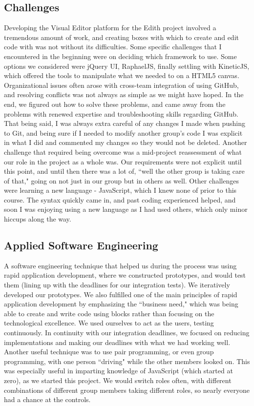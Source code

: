 \documentclass[a4paper]{article}
\begin{document}
\subsection{Challenges}
Developing the Visual Editor platform for the Edith project involved a tremendous amount of work, and creating boxes with which to create and edit code with was not without its difficulties. Some specific challenges that I encountered in the beginning were on deciding which framework to use. Some options we considered were jQuery UI, RaphaelJS, finally settling with KineticJS, which offered the tools to manipulate what we needed to on a HTML5 canvas. Organizational issues often arose with cross-team integration of using GitHub, and resolving conflicts was not always as simple as we might have hoped. In the end, we figured out how to solve these problems, and came away from the problems with renewed expertise and troubleshooting skills regarding GitHub. That being said, I was always extra careful of any changes I made when pushing to Git, and being sure if I needed to modify another group's code I was explicit in what I did and commented my changes so they would not be deleted. Another challenge that required being overcome was a mid-project reassessment of what our role in the project as a whole was. Our requirements were not explicit until this point, and until then there was a lot of, ``well the other group is taking care of that," going on not just in our group but in others as well. Other challenges were learning a new language - JavaScript, which I knew none of prior to this course. The syntax quickly came in, and past coding experienced helped, and soon I was enjoying using a new language as I had used others, which only minor hiccups along the way.
\subsection{Applied Software Engineering}
A software engineering technique that helped us during the process was using rapid application development, where we constructed prototypes, and would test them (lining up with the deadlines for our integration tests). We iteratively developed our prototypes. We also fulfilled one of the main principles of rapid application development by emphasizing the ``business need," which was being able to create and write code using blocks rather than focusing on the technological excellence. We used ourselves to act as the users, testing continuously. In continuity with our integration deadlines, we focused on reducing implementations and making our deadlines with what we had working well. Another useful technique was to use pair programming, or even group programming, with one person ``driving" while the other members looked on. This was especially useful in imparting knowledge of JavaScript (which started at zero), as we started this project. We would switch roles often, with different combinations of different group members taking different roles, so nearly everyone had a chance at the controls.
\end{document}
